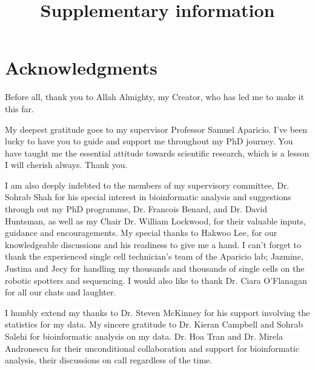 

\makeatletter
\newcommand{\putFigLargCap}[5]
{
\begin{center}
\texttt{[image: \#1]}   
\bigskip
\setbox0\vbox{
\let\caption@rule\relax
\captionof{figure}[#5]{\textbf{#5} #3 \label{#4}}
\global\skip1\lastskip\unskip
\global\setbox1\lastbox

}
\unvbox0
\setbox0\hbox{\unhbox1\unskip\unskip\unpenalty
\global\setbox1\lastbox}
\unvbox1
\vskip\skip1
\end{center}
}
\makeatother





\title{Supplementary information}















\chapter{Acknowledgments}

Before all, thank you to Allah Almighty, my Creator, who has led me to make it this far.

My deepest gratitude goes to my supervisor Professor Samuel Aparicio. I've been lucky to have you to guide and support me throughout my PhD journey. You have taught me the essential attitude towards scientific research, which is a lesson I will cherish always. Thank you.

I am also deeply indebted to the members of my supervisory committee, Dr. Sohrab Shah for his special interest in bioinformatic analysis and suggestions through out my PhD programme, Dr. Francois Benard, and Dr. David Huntsman, as well as my Chair Dr. William Lockwood, for their valuable inputs, guidance and encouragements. My special thanks to Hakwoo Lee, for our knowledgeable discussions and his readiness to give me a hand. I can't forget to thank the experienced single cell technician's team of the Aparicio lab; Jazmine, Justina and Jecy for handling my thousands and thousands of single cells on the robotic spotters and sequencing. I would also like to thank Dr. Ciara O'Flanagan for all our chats and laughter. 

I humbly extend my thanks to Dr. Steven McKinney for his support involving the statistics for my data. My sincere gratitude to Dr. Kieran Campbell and Sohrab Salehi for bioinformatic analysis on my data. Dr. Hoa Tran and Dr. Mirela Andronescu for their unconditional collaboration and support for bioinformatic analysis, their discussions on call regardless of the time. 

